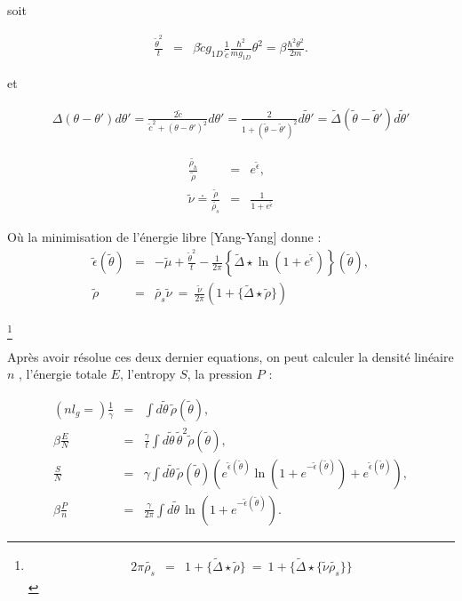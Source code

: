 soit 

\begin{eqnarray*}
	\frac{\tilde{\theta}^2}{t}	 & = & \beta \tilde{c} g_{1D} \frac{1}{\tilde{c}} \frac{\hbar^2}{m g_{1D}} \theta^2 = \beta \frac{ \hbar^2 \theta^2}{2 m}.
\end{eqnarray*}

et 

\begin{eqnarray*}
	\Delta ( \theta - \theta' ) d\theta' = \frac{2 \tilde{c}}{ \tilde{c}^2 + ( \theta - \theta')^2 } d \theta' = \frac{2}{ 1 + ( \tilde{\theta} - \tilde{\theta}')^2 } d\tilde{\theta}' = \tilde{\Delta} ( \tilde{\theta} - \tilde{\theta}') d \tilde{\theta}' 	
\end{eqnarray*}

\begin{eqnarray}
	\frac{\tilde{\rho_h}}{\tilde{\rho}} & = & e^{\tilde{\epsilon} }, \\
	\tilde{\nu} \doteq \frac{\tilde{\rho}}{\tilde{\rho_s}} & = & \frac{1}{1+ e ^{\tilde{\epsilon}} }	
\end{eqnarray}

Où la minimisation de l'énergie libre [Yang-Yang] donne :
\begin{eqnarray}
	\tilde{\epsilon} ( \tilde{\theta} ) & = & - \tilde{\mu} + \frac{\tilde{\theta}^2 }{t} - \frac{1}{2 \pi} \left \{\tilde{\Delta} \star \ln \left ( 1 + e^{\tilde{\epsilon}} \right )  \right \} ( \tilde{\theta} ), \label{eq:1Bess}\\
	\tilde{\rho} &=& \tilde{\rho_s} \tilde{\nu}   ~=~   \frac{\tilde{\nu}}{2 \pi}  ( 1 + \{ \tilde{\Delta} \star \tilde{\rho} \} ) 	 \label{eq:2Bess}
\end{eqnarray}

\footnote{\begin{eqnarray} 2\pi \tilde{\rho_s}  & =  &  1 + \{ \tilde{\Delta} \star \tilde{\rho} \} ~= ~ 1 + \{ \tilde{\Delta} \star \{\tilde{\nu} \tilde{\rho_s}\} \}  \label{eq:3Bess}\end{eqnarray}}

Après avoir résolue ces deux dernier equations, on peut calculer la densité linéaire $n$ , l'énergie totale $E$, l'entropy $S$, la pression $P$ : 

\begin{eqnarray}\label{eq:5Bess}
	(nl_g = ) \frac{1}{\gamma} & = & \int d \tilde{\theta} \,\tilde{\rho}(\tilde{\theta}), \\
	\beta \frac{E}{N} & = & \frac{\gamma}{t} \int d \tilde{\theta}\,  \tilde{\theta}^2 \tilde{\rho}(\tilde{\theta}), \\
	\frac{S}{N} & = & \gamma 	\int d \tilde{\theta} \,\tilde{\rho}(\tilde{\theta}) \left ( e^{\tilde{\epsilon}(\tilde{\theta})} \ln \left ( 1 + e^{-\tilde{\epsilon}(\tilde{\theta})}  \right ) + e^{\tilde{\epsilon}(\tilde{\theta})} \right )  ,\\
	\beta \frac{P}{n}  & = & \frac{\gamma}{2 \pi} \int d \tilde{\theta} \, \ln \left ( 1 + e^{-\tilde{\epsilon}(\tilde{\theta})}  \right ).
\end{eqnarray}


